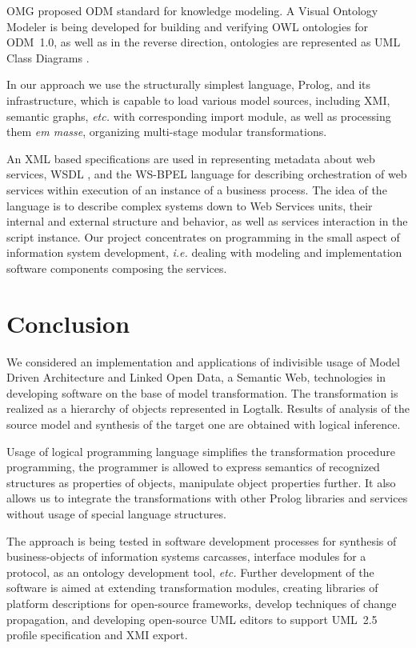 \documentclass[conference,a4paper]{IEEEtran}
\begin{document}
OMG proposed ODM standard \cite{odmprof} for knowledge modeling.  A Visual Ontology Modeler \cite{odnext} is being developed for building and verifying OWL ontologies for ODM~1.0, as well as in the reverse direction, ontologies are represented as UML Class Diagrams \cite{odmvis}.

In our approach we use the structurally simplest language, Prolog, and its infrastructure, which is capable to load various model sources, including XMI, semantic graphs, \emph{etc.} with corresponding import module, as well as processing them \emph{em masse}, organizing multi-stage modular transformations.

An XML based specifications are used in representing metadata about web services, WSDL \cite{wsdl}, and the WS-BPEL language \cite{wsbpel} for describing orchestration of web services within execution of an instance of a business process.  The idea of the language is to describe complex systems down to Web Services units, their internal and external structure and behavior, as well as services interaction in the script instance.  Our project concentrates on programming in the small aspect of information system development, \emph{i.e.} dealing with modeling and implementation software components composing the services.

\section{Conclusion}

We considered an implementation and applications of indivisible usage of Model Driven Architecture and Linked Open Data, a Semantic Web, technologies in developing software on the base of model transformation.  The transformation is realized as a hierarchy of objects represented in Logtalk.  Results of analysis of the source model and synthesis of the target one are obtained with logical inference.

Usage of logical programming language simplifies the transformation procedure programming, the programmer is allowed to express semantics of recognized structures as properties of objects, manipulate object properties further. It also allows us to integrate the transformations with other Prolog libraries and services without usage of special language structures.

The approach is being tested in software development processes for synthesis of business-objects of information systems carcasses, interface modules for a protocol, as an ontology development tool, \emph{etc.} Further development of the software is aimed at extending transformation modules, creating libraries of platform descriptions for open-source frameworks, develop techniques of change propagation, and developing open-source UML editors to support UML~2.5 profile specification \cite{uml25} and XMI export.
\end{document}
